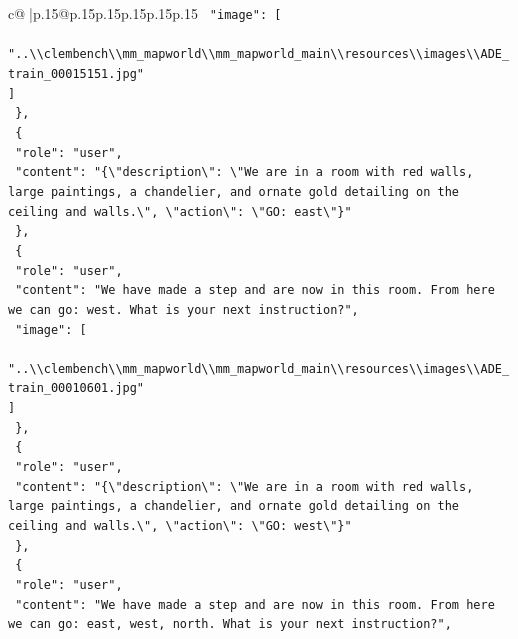\documentclass{article}
\begin{document}
{\begin{supertabular}{c@{$\;$}|p{.15\linewidth}@{}p{.15\linewidth}p{.15\linewidth}p{.15\linewidth}p{.15\linewidth}p{.15\linewidth}}
{{{\texttt{    "image": {[}} \\
\texttt{      "..\textbackslash{}\textbackslash{}clembench\textbackslash{}\textbackslash{}mm\_mapworld\textbackslash{}\textbackslash{}mm\_mapworld\_main\textbackslash{}\textbackslash{}resources\textbackslash{}\textbackslash{}images\textbackslash{}\textbackslash{}ADE\_train\_00015151.jpg"} \\
\texttt{    {]}} \\
\texttt{  \},} \\
\texttt{  \{} \\
\texttt{    "role": "user",} \\
\texttt{    "content": "\{\textbackslash{}"description\textbackslash{}": \textbackslash{}"We are in a room with red walls, large paintings, a chandelier, and ornate gold detailing on the ceiling and walls.\textbackslash{}", \textbackslash{}"action\textbackslash{}": \textbackslash{}"GO: east\textbackslash{}"\}"} \\
\texttt{  \},} \\
\texttt{  \{} \\
\texttt{    "role": "user",} \\
\texttt{    "content": "We have made a step and are now in this room. From here we can go: west. What is your next instruction?",} \\
\texttt{    "image": {[}} \\
\texttt{      "..\textbackslash{}\textbackslash{}clembench\textbackslash{}\textbackslash{}mm\_mapworld\textbackslash{}\textbackslash{}mm\_mapworld\_main\textbackslash{}\textbackslash{}resources\textbackslash{}\textbackslash{}images\textbackslash{}\textbackslash{}ADE\_train\_00010601.jpg"} \\
\texttt{    {]}} \\
\texttt{  \},} \\
\texttt{  \{} \\
\texttt{    "role": "user",} \\
\texttt{    "content": "\{\textbackslash{}"description\textbackslash{}": \textbackslash{}"We are in a room with red walls, large paintings, a chandelier, and ornate gold detailing on the ceiling and walls.\textbackslash{}", \textbackslash{}"action\textbackslash{}": \textbackslash{}"GO: west\textbackslash{}"\}"} \\
\texttt{  \},} \\
\texttt{  \{} \\
\texttt{    "role": "user",} \\
\texttt{    "content": "We have made a step and are now in this room. From here we can go: east, west, north. What is your next instruction?",} \\
}}}
\end{supertabular}}
\end{document}
